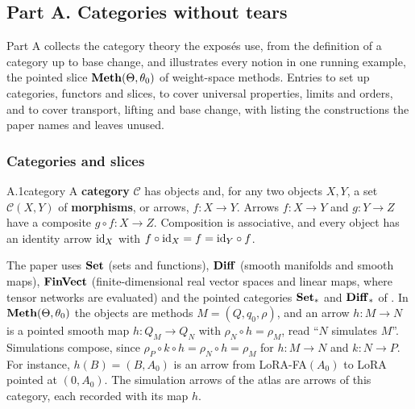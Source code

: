 \subsection*{Part A. Categories without tears}
\label{app:bg-a}

Part A collects the category theory the exposés use, from the definition of a category up to base change, and
illustrates every notion in one running example, the pointed slice $\mathbf{Meth}(\Theta,\theta_0)$ of weight-space methods.
Entries  to  set up categories, functors and slices,  to  cover universal
properties, limits and orders, and  to  cover transport, lifting and base change, with
 listing the constructions the paper names and leaves unused.

\subsubsection*{Categories and slices}

\begin{bgentry}{A.1}{category}
A \textbf{category} $\mathcal C$ has objects and, for any two objects $X,Y$, a set $\mathcal C(X,Y)$ of
\textbf{morphisms}, or arrows, $f:X\to Y$. Arrows $f:X\to Y$ and $g:Y\to Z$ have a composite $g\circ f:X\to Z$.
Composition is associative, and every object has an identity arrow $\mathrm{id}_X$ with $f\circ\mathrm{id}_X=f=\mathrm{id}_Y\circ f$.
\end{bgentry}

The paper uses $\mathbf{Set}$ (sets and functions), $\mathbf{Diff}$ (smooth manifolds and smooth maps), $\mathbf{FinVect}$ (finite-dimensional
real vector spaces and linear maps, where tensor networks are evaluated) and the pointed categories $\mathbf{Set}_*$ and
$\mathbf{Diff}_*$ of . In $\mathbf{Meth}(\Theta,\theta_0)$ the objects are methods $M=(Q,q_0,\rho)$, and an arrow $h:M\to N$
is a pointed smooth map $h:Q_M\to Q_N$ with $\rho_N\circ h=\rho_M$, read ``$N$ simulates $M$''. Simulations compose,
since $\rho_P\circ k\circ h=\rho_N\circ h=\rho_M$ for $h:M\to N$ and $k:N\to P$. For instance, $h(B)=(B,A_0)$ is an
arrow from LoRA-FA$(A_0)$ \citep{zhang2023lora} to LoRA pointed at $(0,A_0)$. The simulation arrows of the atlas are
arrows of this category, each recorded with its map $h$.


